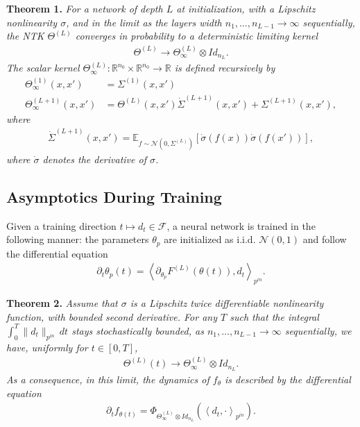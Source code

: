 \documentclass[10pt]{article}
\newcommand{\RR}{\mathbb{R}}
\newcommand{\EE}{\mathbb{E}}
\newcommand{\FF}{\mathcal{F}}
\newcommand{\NN}{\mathcal{N}}
\newcommand{\inner}[2]{\left\langle #1, #2 \right\rangle}
\newcommand{\paran}[1]{{( #1 )}}
\newcommand{\pin}{{p^{in}}}
\begin{document}
\textbf{Theorem 1.} \textit{For a network of depth $L$ at initialization, with a Lipschitz nonlinearity $\sigma$, and in the limit as the layers width $n_1, \ldots, n_{L - 1} \rightarrow \infty$ sequentially, the NTK $\Theta^\paran{L}$ converges in probability to a deterministic limiting kernel
\begin{align*}
\Theta^\paran{L} \rightarrow \Theta^\paran{L}_\infty \otimes Id_{n_L}.
\end{align*}
The scalar kernel $\Theta^\paran{L}_\infty : \RR^{n_0} \times \RR^{n_0} \rightarrow \RR$ is defined recursively by
\begin{align*}
\Theta^\paran{1}_\infty(x,x') &= \Sigma^\paran{1}(x,x') \\
\Theta^\paran{L + 1}_\infty(x,x') &= \Theta^\paran{L}(x,x') \dot{\Sigma}^\paran{L + 1}(x,x') + \Sigma^\paran{L + 1}(x,x'),
\end{align*}
where
\begin{align*}
\dot{\Sigma}^\paran{L + 1}(x,x') = \EE_{f \sim \NN(0,\Sigma^\paran{L})} [ \dot{\sigma}(f(x)) \dot{\sigma}(f(x'))],
\end{align*}
where $\dot{\sigma}$ denotes the derivative of $\sigma$.}

\newpage

\subsection{Asymptotics During Training}

Given a training direction $t \mapsto d_t \in \FF$, a neural network is trained in the following manner: the parameters $\theta_p$ are initialized as i.i.d. $\NN(0,1)$ and follow the differential equation
\begin{align*}
\partial_t \theta_p(t) = \inner{\partial_{\theta_p} F^\paran{L}(\theta(t))}{d_t}_\pin.
\end{align*}

\textbf{Theorem 2.} \textit{Assume that $\sigma$ is a Lipschitz twice differentiable nonlinearity function, with bounded second derivative. For any $T$ such that the integral $\int_0^T \|d_t\|_\pin \, dt$ stays stochastically bounded, as $n_1, \ldots, n_{L - 1} \rightarrow \infty$ sequentially, we have, uniformly for $t \in [0,T]$,
\begin{align*}
\Theta^\paran{L}(t) \rightarrow \Theta^\paran{L}_\infty \otimes Id_{n_L}.
\end{align*}
As a consequence, in this limit, the dynamics of $f_\theta$ is described by the differential equation
\begin{align*}
\partial_t f_{\theta(t)} = \Phi_{\Theta^\paran{L}_\infty \otimes Id_{n_L}} \left( \inner{d_t}{\cdot}_\pin \right).
\end{align*}}
\end{document}
